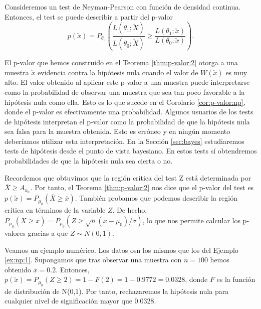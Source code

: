         \begin{cor} \label{cor:p-valor:np}
            Consideremos un test de Neyman-Pearson con función de densidad continua. Entonces, el test se puede describir a partir del p-valor
           \[p(\utilde{x}) = P_{\theta_0}\left(\frac{L(\theta_1;\utilde{X})}{L(\theta_0;\utilde{X})} \ge \frac{L(\theta_1;\utilde{x})}{L(\theta_0;\utilde{x})}\right).  \]
       \end{cor}

        El p-valor que hemos construido en el Teorema \ref{thm:p-valor:2} otorga a una muestra $\utilde{x}$ evidencia contra la hipótesis nula cuando el valor de $W(\utilde{x})$ es muy alto. El valor obtenido al aplicar este p-valor a una muestra puede interpretarse como la probabilidad de observar una muestra que sea tan poco favorable a la hipótesis nula como ella. Esto es lo que sucede en el Corolario \ref{cor:p-valor:np}, donde el p-valor es efectivamente una probabilidad. Algunos usuarios de los tests de hipótesis interpretan el p-valor como la probabilidad de que la hipótesis nula sea falsa para la muestra obtenida. Esto es erróneo y en ningún momento deberíamos utilizar esta interpretación. En la Sección \ref{sec:bayes} estudiaremos tests de hipótesis desde el punto de vista bayesiano. En estos tests sí obtendremos probabilidades de que la hipótesis nula sea cierta o no.

        \begin{ex}
            Recordemos que obtuvimos que la región crítica del test Z está determinada por $\overline{X} \ge A_{k_\alpha}$. Por tanto, el Teorema \ref{thm:p-valor:2} nos dice que el p-valor del test es $p(\utilde{x}) = P_{\mu_0}(\overline{X} \ge \overline{x})$. También probamos que podemos describir la región crítica en términos de la variable $Z$. De hecho, $P_{\mu_0}(\overline{X} \ge \overline{x}) = P_{\mu_0}(Z \ge \sqrt{n}(\overline{x} - \mu_0)/\sigma)$, lo que nos permite calcular los p-valores gracias a que $Z \sim N(0,1)$.

            Veamos un ejemplo numérico. Los datos osn los mismos que los del Ejemplo \ref{ex:np:1}. Supongamos que tras observar una muestra con $n = 100$ hemos obtenido $\overline{x} = 0.2$. Entonces, $p(\utilde{x}) = P_{\mu_0}(Z \ge 2) = 1 - F(2) = 1 - 0.9772 = 0.0328$, donde $F$ es la función de distribución de N(0,1). Por tanto, rechazaremos la hipótesis nula para cualquier nivel de significación mayor que $0.0328$.
        \end{ex}

